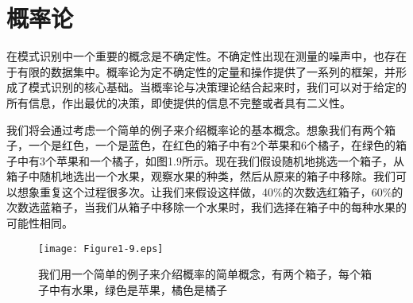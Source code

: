 \section{概率论}
	在模式识别中一个重要的概念是不确定性。不确定性出现在测量的噪声中，也存在于有限的数据集中。概率论为定不确定性的定量和操作提供了一系列的框架，并形成了模式识别的核心基础。当概率论与决策理论结合起来时，我们可以对于给定的所有信息，作出最优的决策，即使提供的信息不完整或者具有二义性。
	
	我们将会通过考虑一个简单的例子来介绍概率论的基本概念。想象我们有两个箱子，一个是红色，一个是蓝色，在红色的箱子中有2个苹果和6个橘子，在绿色的箱子中有3个苹果和一个橘子，如图1.9所示。现在我们假设随机地挑选一个箱子，从箱子中随机地选出一个水果，观察水果的种类，然后从原来的箱子中移除。我们可以想象重复这个过程很多次。让我们来假设这样做，40\%的次数选红箱子，60\%的次数选蓝箱子，当我们从箱子中移除一个水果时，我们选择在箱子中的每种水果的可能性相同。
	
	\begin{figure}[b]
		\parbox{.4\textwidth}{\caption{我们用一个简单的例子来介绍概率的简单概念，有两个箱子，每个箱子中有水果，绿色是苹果，橘色是橘子}}
		\parbox{.5\textwidth}{\texttt{[image: Figure1-9.eps]}}
	\end{figure}